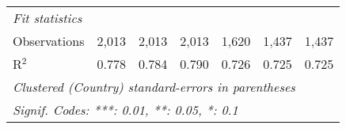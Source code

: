 \begin{tabular}{lcccccc}
   \midrule \emph{Fit statistics}\\
   Observations                                                                                    & 2,013       & 2,013         & 2,013          & 1,620          & 1,437          & 1,437\\  
   R$^2$                                                                                           & 0.778       & 0.784         & 0.790          & 0.726          & 0.725          & 0.725\\  
   \midrule
   \multicolumn{7}{l}{\emph{Clustered (Country) standard-errors in parentheses}}\\
   \multicolumn{7}{l}{\emph{Signif. Codes: ***: 0.01, **: 0.05, *: 0.1}}\\
\end{tabular}
\par\endgroup


